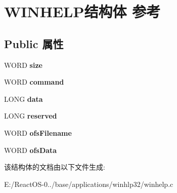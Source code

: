 \hypertarget{struct_w_i_n_h_e_l_p}{}\section{W\+I\+N\+H\+E\+L\+P结构体 参考}
\label{struct_w_i_n_h_e_l_p}
\subsection*{Public 属性}
\begin{DoxyCompactItemize}
\item 
\mbox{\label{struct_w_i_n_h_e_l_p_a235c33d0565f32b1eb0e1be63b3aeddf}} 
W\+O\+RD {\bfseries size}
\item 
\mbox{\label{struct_w_i_n_h_e_l_p_a47a38703acb6e1cf4b668bca24094857}} 
W\+O\+RD {\bfseries command}
\item 
\mbox{\label{struct_w_i_n_h_e_l_p_afcc2a27e3502f11bebf1aaca400f6162}} 
L\+O\+NG {\bfseries data}
\item 
\mbox{\label{struct_w_i_n_h_e_l_p_a794ed2d3902892f65bdd8bb191670adb}} 
L\+O\+NG {\bfseries reserved}
\item 
\mbox{\label{struct_w_i_n_h_e_l_p_a9173caa441a9f686cfb14f5b563a4200}} 
W\+O\+RD {\bfseries ofs\+Filename}
\item 
\mbox{\label{struct_w_i_n_h_e_l_p_a7543ee5c72469618c690fa5a07d4f9fe}} 
W\+O\+RD {\bfseries ofs\+Data}
\end{DoxyCompactItemize}


该结构体的文档由以下文件生成\+:\begin{DoxyCompactItemize}
\item 
E\+:/\+React\+O\+S-\/0../base/applications/winhlp32/winhelp.\+c\end{DoxyCompactItemize}
